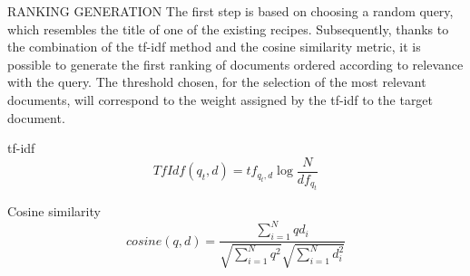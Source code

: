 \begin{frame}{RANKING GENERATION}
    The first step is based on choosing a random query, which resembles the title of one of the existing recipes. Subsequently, thanks to the combination of the tf-idf method and the cosine similarity metric, it is possible to generate the first ranking of documents ordered according to relevance with the query. The threshold chosen, for the selection of the most relevant documents, will correspond to the weight assigned by the tf-idf to the target document.
    \begin{minipage}{\linewidth}
        \centering
        \begin{minipage}{0.45\linewidth}
            \begin{block}{\centering tf-idf}
                \small $$ TfIdf(q_t,d) = tf_{q_t,d} \log\frac{N}{df_{q_t}}$$
            \end{block}
        \end{minipage}
        \hspace{0.05\linewidth}
        \begin{minipage}{0.45\linewidth}
            \begin{block}{\centering Cosine similarity}
                \small $$ cosine(q,d) = \frac{\sum_{i=1}^Nqd_i}{\sqrt{\sum_{i=1}^Nq^2}\sqrt{\sum_{i=1}^Nd_i^2}} $$
            \end{block}
        \end{minipage}
    \end{minipage}
\end{frame}


